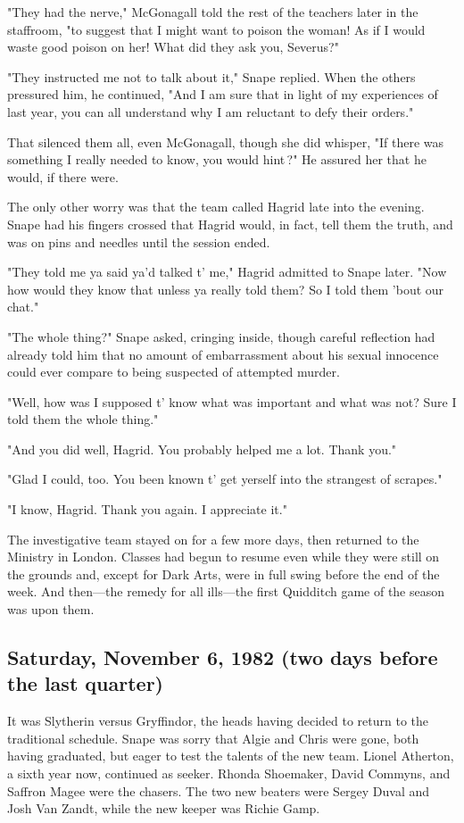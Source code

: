 "They had the nerve," McGonagall told the rest of the teachers later in the staffroom, "to suggest that I might want to poison the woman! As if I would waste good poison on her! What did they ask you, Severus?"

"They instructed me not to talk about it," Snape replied. When the others pressured him, he continued, "And I am sure that in light of my experiences of last year, you can all understand why I am reluctant to defy their orders."

That silenced them all, even McGonagall, though she did whisper, "If there was something I really needed to know, you would hint{\el}\,?" He assured her that he would, if there were.

The only other worry was that the team called Hagrid late into the evening. Snape had his fingers crossed that Hagrid would, in fact, tell them the truth, and was on pins and needles until the session ended.

"They told me ya said ya'd talked t' me," Hagrid admitted to Snape later. "Now how would they know that unless ya really told them? So I told them 'bout our chat."

"The whole thing?" Snape asked, cringing inside, though careful reflection had already told him that no amount of embarrassment about his sexual innocence could ever compare to being suspected of attempted murder.

"Well, how was I supposed t' know what was important and what was not? Sure I told them the whole thing."

"And you did well, Hagrid. You probably helped me a lot. Thank you."

"Glad I could, too. You been known t' get yerself into the strangest of scrapes."

"I know, Hagrid. Thank you again. I appreciate it."

The investigative team stayed on for a few more days, then returned to the Ministry in London. Classes had begun to resume even while they were still on the grounds and, except for Dark Arts, were in full swing before the end of the week. And then—the remedy for all ills—the first Quidditch game of the season was upon them.

\subsection{Saturday, November 6, 1982 (two days before the last quarter)}

It was Slytherin versus Gryffindor, the heads having decided to return to the traditional schedule. Snape was sorry that Algie and Chris were gone, both having graduated, but eager to test the talents of the new team. Lionel Atherton, a sixth year now, continued as seeker. Rhonda Shoemaker, David Commyns, and Saffron Magee were the chasers. The two new beaters were Sergey Duval and Josh Van Zandt, while the new keeper was Richie Gamp.

